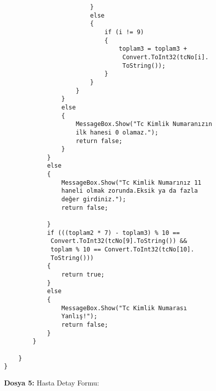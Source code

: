 \begin{lstlisting}
                        }
                        else
                        {
                            if (i != 9)
                            {
                                toplam3 = toplam3 +
                                 Convert.ToInt32(tcNo[i].
                                 ToString());
                            }
                        }
                    }
                }
                else
                {
                    MessageBox.Show("Tc Kimlik Numaranızın 
                    ilk hanesi 0 olamaz.");
                    return false;
                }
            }
            else
            {
                MessageBox.Show("Tc Kimlik Numarınız 11 
                haneli olmak zorunda.Eksik ya da fazla 
                değer girdiniz.");
                return false;

            }
            if (((toplam2 * 7) - toplam3) % 10 ==
             Convert.ToInt32(tcNo[9].ToString()) && 
             toplam % 10 == Convert.ToInt32(tcNo[10].
             ToString()))
            {
                return true;
            }
            else
            {
                MessageBox.Show("Tc Kimlik Numarası 
                Yanlış!");
                return false;
            }
        }

    }
}
\end{lstlisting}

\textbf{Dosya 5:} Hasta Detay Formu:

